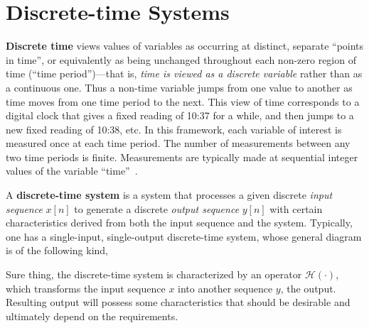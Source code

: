 \documentclass[\documentfontsize, twocolumn]{\classname}
\begin{document}
\chapter{Discrete-time Systems}

\textbf{Discrete time} views values of variables as occurring at distinct, separate ``points in time'', or equivalently as being unchanged throughout each non-zero region of time (``time pe\-ri\-od'')---that is, \emph{time is viewed as a discrete variable} rather than as a continuous one. Thus a non-time variable jumps from one value to another as time moves from one time period to the next. This view of time corresponds to a digital clock that gives a fixed reading of 10:37 for a while, and then jumps to a new fixed reading of 10:38, etc. In this framework, each variable of interest is measured once at each time period. The number of measurements between any two time periods is finite. Measurements are typically made at sequential integer values of the variable ``time''~\cite{bib:discreteTimeSystems}.

A \textbf{discrete-time system} is a system that processes a given discrete \emph{input sequence} $x[n]$ to generate a discrete \emph{output sequence} $y[n]$ with certain characteristics derived from both the input sequence and the system. Typically, one has a single-input, single-output discrete-time system, whose general diagram is of the following kind,
\begin{center}
\end{center}
Sure thing, the discrete-time system is characterized by an operator $\mathcal H(\cdot)$, which transforms the input sequence $x$ into another sequence $y$, the output. Resulting output will possess some characteristics that should be desirable and ultimately depend on the requirements.
\end{document}
